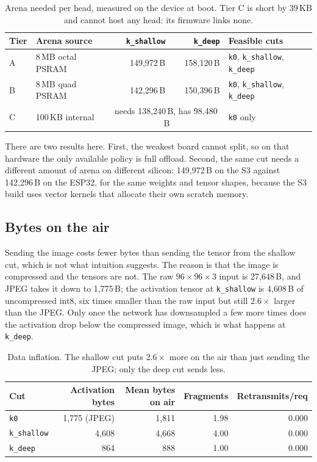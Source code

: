 \documentclass[11pt,a4paper]{article}
\begin{document}
\begin{table}[h]
\centering
\begin{tabular}{llrrl}
\toprule
Tier & Arena source & \texttt{k\_shallow} & \texttt{k\_deep} & Feasible cuts \\
\midrule
A & 8\,MB octal PSRAM   & 149{,}972\,B & 158{,}120\,B & \texttt{k0}, \texttt{k\_shallow}, \texttt{k\_deep} \\
B & 8\,MB quad PSRAM    & 142{,}296\,B & 150{,}396\,B & \texttt{k0}, \texttt{k\_shallow}, \texttt{k\_deep} \\
C & 100\,KB internal    & \multicolumn{2}{c}{needs 138{,}240\,B, has 98{,}480\,B} & \texttt{k0} only \\
\bottomrule
\end{tabular}
\caption{Arena needed per head, measured on the device at boot. Tier C is short
by 39\,KB and cannot host any head: its firmware links none.}
\label{tab:feasibility}
\end{table}

There are two results here. First, the weakest board cannot split, so on that
hardware the only available policy is full offload. Second, the same cut needs a
different amount of arena on different silicon: 149{,}972\,B on the S3 against
142{,}296\,B on the ESP32, for the same weights and tensor shapes, because the S3
build uses vector kernels that allocate their own scratch memory.

\subsection{Bytes on the air}

Sending the image costs fewer bytes than sending the tensor from the shallow cut,
which is not what intuition suggests. The reason is that the image is compressed
and the tensors are not. The raw $96\times96\times3$ input is 27{,}648\,B, and
JPEG takes it down to 1{,}775\,B; the activation tensor at \texttt{k\_shallow} is
4{,}608\,B of uncompressed int8, six times smaller than the raw input but still
$2.6\times$ larger than the JPEG. Only once the network has downsampled a few
more times does the activation drop below the compressed image, which is what
happens at \texttt{k\_deep}.

\begin{table}[h]
\centering
\begin{tabular}{lrrrr}
\toprule
Cut & Activation bytes & Mean bytes on air & Fragments & Retransmits/req \\
\midrule
\texttt{k0}        & 1{,}775 (JPEG) & 1{,}811 & 1.98 & 0.000 \\
\texttt{k\_shallow} & 4{,}608 & 4{,}668 & 4.00 & 0.000 \\
\texttt{k\_deep}    & 864     & 888     & 1.00 & 0.000 \\
\bottomrule
\end{tabular}
\caption{Data inflation. The shallow cut puts $2.6\times$ more on the air than
just sending the JPEG; only the deep cut sends less.}
\label{tab:bytes}
\end{table}
\end{document}
